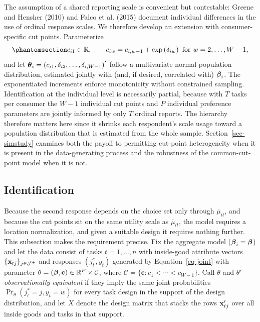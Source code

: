 \documentclass[
  letterpaper,
  DIV=11,
  numbers=noendperiod]{scrartcl}
\theoremstyle{plain}
\theoremstyle{plain}
\theoremstyle{remark}
\begin{document}
The assumption of a shared reporting scale is convenient but
contestable: Greene and Hensher (2010) and Falco et al. (2015) document
individual differences in the use of ordinal response scales. We
therefore develop an extension with consumer-specific cut points.
Parameterize
\begin{equation}\protect\phantomsection\label{eq-hetcutparam}{
c_{i1} \in \mathbb{R},
\qquad
c_{iw} = c_{i,w-1} + \exp \left( \delta_{iw} \right) \ \text{for} \ w = 2, \ldots, W-1,
}\end{equation} and let
\(\boldsymbol{\theta}_i = \left( c_{i1}, \delta_{i2}, \ldots, \delta_{i,W-1} \right)'\)
follow a multivariate normal population distribution, estimated jointly
with (and, if desired, correlated with) \(\boldsymbol{\beta}_i\). The exponentiated
increments enforce monotonicity without constrained sampling.
Identification at the individual level is necessarily partial, because
with \(T\) tasks per consumer the \(W-1\) individual cut points and
\(P\) individual preference parameters are jointly informed by only
\(T\) ordinal reports. The hierarchy therefore matters here since it
shrinks each respondent's scale usage toward a population distribution
that is estimated from the whole sample. Section~\ref{sec-simstudy}
examines both the payoff to permitting cut-point heterogeneity when it
is present in the data-generating process and the robustness of the
common-cut-point model when it is not.

\subsection{Identification}\label{sec-identification}

Because the second response depends on the choice set only through
\(\overline{\mu}_{it}\), and because the cut points sit on the same
utility scale as \(\overline{\mu}_{it}\), the model requires a location
normalization, and given a suitable design it requires nothing further.
This subsection makes the requirement precise. Fix the aggregate model
(\(\boldsymbol{\beta}_i = \boldsymbol{\beta}\)) and let the data consist of tasks
\(t=1,\ldots,n\) with inside-good attribute vectors
\(\lbrace \mathbf{x}_{tj} \rbrace_{j \in \mathcal{J}^+}\) and responses
\(\left( j^*_t, y_t \right)\) generated by Equation~\ref{eq-joint} with
parameter
\(\theta = \left( \boldsymbol{\beta}, \mathbf{c} \right) \in \mathbb{R}^P \times \mathcal{C}\),
where
\(\mathcal{C} = \lbrace \mathbf{c} : c_1 < \cdots < c_{W-1} \rbrace\).
Call \(\theta\) and \(\theta'\) \emph{observationally equivalent} if
they imply the same joint probabilities
\(\Pr_\theta \left( j^*_t = j, y_t = w \right)\) for every task design
in the support of the design distribution, and let \(X\) denote the
design matrix that stacks the rows \(\mathbf{x}_{tj}'\) over all inside goods
and tasks in that support.
\end{document}
